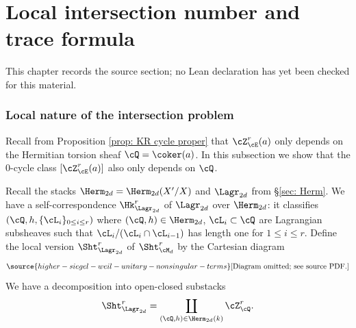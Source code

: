 \chapter{Local intersection number and trace formula}
\label{higher-siegel-weil-unitary-nonsingular-terms-chapter-11}

\begin{remark}
\label{higher-siegel-weil-unitary-nonsingular-terms-chapter-11-source}
This chapter records the source section; no Lean declaration has yet been checked for this material.
\notready
\end{remark}

\label{s:int trace}

\subsection{Local nature of the intersection problem}Recall from Proposition \ref{prop: KR cycle proper} that $\cZ^{r}_{\cE}(a)$ only depends on the Hermitian torsion sheaf $\cQ=\coker(a)$. In this subsection we show that the $0$-cycle class $[\cZ^{r}_{\cE}(a)]$ also only depends on $\cQ$.

Recall the stacks $\Herm_{2d}=\Herm_{2d}(X'/X)$ and $\Lagr_{2d}$ from \S \ref{sec: Herm}. We have a self-correspondence $\Hk^{r}_{\Lagr_{2d}}$ of $\Lagr_{2d}$ over $\Herm_{2d}$: it classifies
$(\cQ,h,\{\cL_{i}\}_{0\le i\le r})$ where $(\cQ,h)\in \Herm_{2d}$, $\cL_{i}\subset \cQ$ are Lagrangian subsheaves such that $\cL_{i}/(\cL_{i}\cap \cL_{i-1})$ has length one for $1\le i\le r$.
Define the local version $\Sht^{r}_{\Lagr_{2d}}$ of $\Sht^{r}_{\cM_{d}}$ by the Cartesian diagram
\begin{equation}\label{Sht Lag}
\source{higher-siegel-weil-unitary-nonsingular-terms}
\text{[Diagram omitted; see source PDF.]}
\end{equation}
We have a decomposition into open-closed substacks
\begin{equation}
\Sht^{r}_{\Lagr_{2d}}=\coprod_{(\cQ,h)\in\Herm_{2d}(k)} \cZ^{r}_{\cQ}.
\end{equation}

